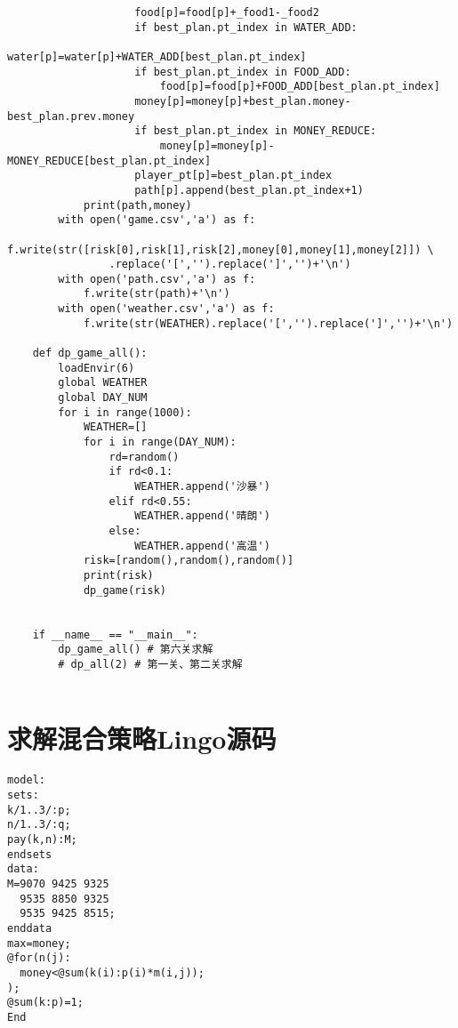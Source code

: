\documentclass[bwprint]{cumcmthesis} %
\begin{document}
\begin{appendices}
\begin{lstlisting}
                    food[p]=food[p]+_food1-_food2
                    if best_plan.pt_index in WATER_ADD:
                        water[p]=water[p]+WATER_ADD[best_plan.pt_index]
                    if best_plan.pt_index in FOOD_ADD:
                        food[p]=food[p]+FOOD_ADD[best_plan.pt_index]
                    money[p]=money[p]+best_plan.money-best_plan.prev.money
                    if best_plan.pt_index in MONEY_REDUCE:
                        money[p]=money[p]-MONEY_REDUCE[best_plan.pt_index]
                    player_pt[p]=best_plan.pt_index
                    path[p].append(best_plan.pt_index+1)
            print(path,money)
        with open('game.csv','a') as f:
            f.write(str([risk[0],risk[1],risk[2],money[0],money[1],money[2]]) \
                .replace('[','').replace(']','')+'\n')
        with open('path.csv','a') as f:
            f.write(str(path)+'\n')
        with open('weather.csv','a') as f:
            f.write(str(WEATHER).replace('[','').replace(']','')+'\n')
    
    def dp_game_all():
        loadEnvir(6)
        global WEATHER
        global DAY_NUM
        for i in range(1000):
            WEATHER=[]
            for i in range(DAY_NUM):
                rd=random()
                if rd<0.1:
                    WEATHER.append('沙暴')
                elif rd<0.55:
                    WEATHER.append('晴朗')
                else:
                    WEATHER.append('高温')
            risk=[random(),random(),random()]
            print(risk)
            dp_game(risk)
    
    
    if __name__ == "__main__":
        dp_game_all() # 第六关求解
        # dp_all(2) # 第一关、第二关求解
                
\end{lstlisting}

\newpage



\section{求解混合策略Lingo源码}

\begin{lstlisting}
model:
sets:
k/1..3/:p;
n/1..3/:q;
pay(k,n):M;
endsets
data:
M=9070 9425 9325
  9535 8850 9325
  9535 9425 8515;
enddata
max=money;
@for(n(j):
  money<@sum(k(i):p(i)*m(i,j));
);
@sum(k:p)=1;
End

\end{lstlisting}



\end{appendices}
\end{document}

